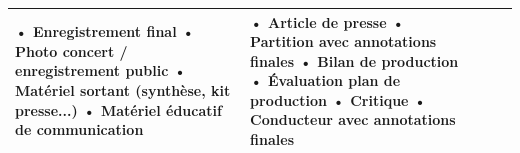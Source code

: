 \begin{landscape}
\begin{table}[htbp]
{\begin{tabular}{|p{3.4cm}|p{6.8cm}|p{3.8cm}|p{3.2cm}|p{3.2cm}|}
				• Enregistrement final \newline
				• Photo concert / enregistrement public \newline
				• Matériel sortant (synthèse, kit presse...) \newline
				• Matériel éducatif de communication & 
				
				• Article de presse \newline
				• Partition avec annotations finales \newline
				• Bilan de production \newline
				• Évaluation plan de production \newline
				• Critique \newline
				• Conducteur avec annotations finales \\ 
				\hline
			\end{tabular}
		}
	\end{table}
\end{landscape}